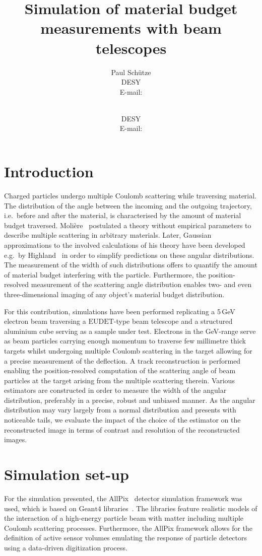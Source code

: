 \documentclass{PoS}
\title{Simulation of material budget measurements with beam telescopes}
\author{Paul Sch\"utze\\
        DESY\\
        E-mail: \email{paul.schuetze@desy.de}}
\author{\speaker{Hendrik Jansen}\\
        DESY\\
        E-mail: \email{hendrik.jansen@desy.de}}
\newcommand{\eudet}{\ensuremath{\textrm{EUDET}}}
\newcommand{\Geant}{\ensuremath{\textrm{Geant4}}}
\begin{document}
\section{Introduction}
Charged particles undergo multiple Coulomb scattering while traversing material. 
The distribution of the angle between the incoming and the outgoing trajectory, i.e.\ before and after the material, is characterised by the amount of material budget traversed. 
Moli\`ere~\cite{moliere} postulated a theory without empirical parameters to describe multiple scattering in arbitrary materials.
Later, Gaussian approximations to the involved calculations of his theory have been developed e.g.\ by Highland~\cite{ref:scatteringhighland} in order to simplify predictions on these angular distributions.
The measurement of the width of such distributions offers to quantify the amount of material budget interfering with the particle. 
Furthermore, the position-resolved measurement of the scattering angle distribution enables two- and even three-dimensional imaging of any object's material budget distribution.


For this contribution, simulations have been performed replicating a 5\,GeV electron beam traversing a $\eudet$-type beam telescope \cite{JansenEPJ} and a structured aluminium cube serving as a sample under test. 
Electrons in the GeV-range serve as beam particles carrying enough momentum to traverse few millimetre thick targets
 whilst undergoing multiple Coulomb scattering in the target allowing for a precise measurement of the deflection. 
A track reconstruction is performed enabling the position-resolved computation of the scattering angle of beam particles at the target arising from the multiple scattering therein.
Various estimators are constructed in order to measure the width of the angular distribution, preferably  in a precise, robust and unbiased manner. 
As the angular distribution may vary largely from a normal distribution and presents with noticeable tails,
 we evaluate the impact of the choice of the estimator on the reconstructed image in terms of contrast and resolution of the reconstructed images. 


\section{Simulation set-up}
For the simulation presented, the AllPix~\cite{ref:AllPix} detector simulation framework was used, which is based on $\Geant$ libraries~\cite{Agostinelli2003250,1610988}.
The libraries feature realistic models of the interaction of a high-energy particle beam with matter including multiple Coulomb scattering processes.
Furthermore, the AllPix framework allows for the definition of active sensor volumes emulating the response of particle detectors using a data-driven digitization process. 
\end{document}
